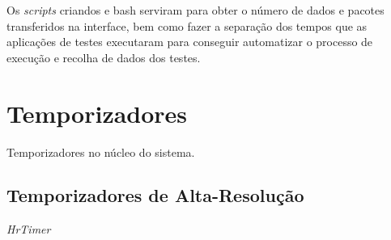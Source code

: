 Os \textit{scripts} criandos e bash serviram para obter o número de dados e pacotes transferidos na interface, bem como fazer a separação dos tempos que as aplicações de testes executaram para conseguir automatizar o processo de execução e recolha de dados dos testes.


\section{Temporizadores}

Temporizadores no núcleo do sistema.


\subsection{Temporizadores de Alta-Resolução}

\textit{HrTimer}
